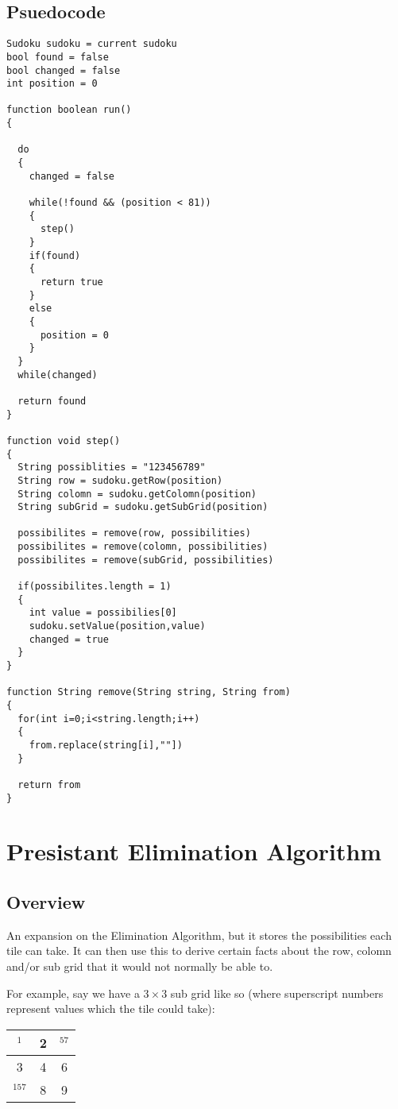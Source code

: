 \documentclass[10pt,letterpaper]{article}
\begin{document}
    \subsection{Psuedocode}
      \begin{verbatim}
Sudoku sudoku = current sudoku
bool found = false
bool changed = false
int position = 0

function boolean run()
{
  
  do
  {
    changed = false
    
    while(!found && (position < 81))
    {
      step()
    }
    if(found)
    {
      return true
    }
    else
    {
      position = 0
    }
  }
  while(changed)
  
  return found
}

function void step()
{
  String possiblities = "123456789"
  String row = sudoku.getRow(position)
  String colomn = sudoku.getColomn(position)
  String subGrid = sudoku.getSubGrid(position)
  
  possibilites = remove(row, possibilities)
  possibilites = remove(colomn, possibilities)
  possibilites = remove(subGrid, possibilities)
  
  if(possibilites.length = 1)
  {
    int value = possibilies[0]
    sudoku.setValue(position,value)
    changed = true
  }
}

function String remove(String string, String from)
{
  for(int i=0;i<string.length;i++)
  {
    from.replace(string[i],""])
  }
  
  return from
}
      \end{verbatim}
      
  \section{Presistant Elimination Algorithm}
    \subsection{Overview}
      An expansion on the Elimination Algorithm, but it stores the possibilities each tile can take. It can then use this to derive certain facts about the row, colomn and/or sub grid that it would not normally be able to.
      
      For example, say we have a \(3\times 3\) sub grid like so (where superscript numbers represent values which the tile could take):
	
      \begin{tabular}{ | c | c | c | }
	\hline
	 \(^1\)&2&\(^{57}\) \\
	\hline
	3&4&6\\
	\hline
	 \(^{157}\)&8&9\\
	\hline
      \end{tabular}
      
\end{document}
